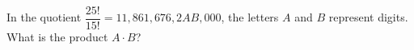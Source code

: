 In the quotient $\dfrac{25!}{15!}=11{,}861{,}676{,}2AB{,}000$, the letters $A$ and $B$ represent digits. What is the product $A\cdot B$?

